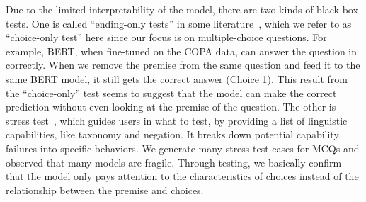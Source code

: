 Due to the limited interpretability of the model, 
there are two kinds of black-box tests.
One is called ``ending-only tests'' in some literature~\cite{endingonly1,endingonly2}, 
which we refer to as ``choice-only test'' here since our focus is 
on multiple-choice questions.
For example, BERT, when fine-tuned on the COPA data, can answer
the question in  correctly. When we remove the premise from 
the same question and feed it to the same BERT model, it still
gets the correct answer (Choice 1). This result from the ``choice-only'' 
test seems to suggest that the model can make the correct prediction
without even looking at the premise of the question. 
The other is stress test~\cite{checklist2020acl}, which guides users in what to test, by providing
a list of linguistic capabilities, like taxonomy and negation. It breaks down potential capability
failures into specific behaviors. We generate many stress test cases for MCQs 
and observed that many models are fragile.
Through testing, we basically confirm that the model only pays attention 
to the characteristics of choices instead of the relationship between the premise and
choices.







%

